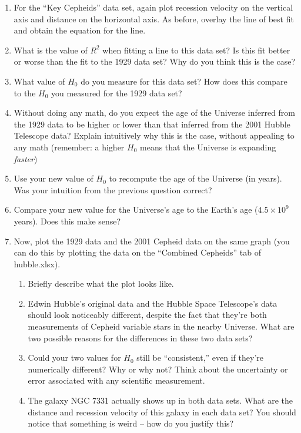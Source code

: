 \documentclass[11pt]{article}
\begin{document}
\begin{enumerate}[resume]
    \item For the ``Key Cepheids'' data set, again plot recession velocity on the vertical axis and distance on the horizontal axis. As before, overlay the line of best fit and obtain the equation for the line.
    
    \item What is the value of $R^2$ when fitting a line to this data set? Is this fit better or worse than the fit to the 1929 data set? Why do you think this is the case?
    
    \item What value of $H_0$ do you measure for this data set? How does this compare to the $H_0$ you measured for the 1929 data set? 
    
    \item Without doing any math, do you expect the age of the Universe inferred from the 1929 data to be higher or lower than that inferred from the 2001 Hubble Telescope data? Explain intuitively why this is the case, without appealing to any math (remember: a higher $H_0$ means that the Universe is expanding \emph{faster})
    
    \item Use your new value of $H_0$ to recompute the age of the Universe (in years). Was your intuition from the previous question correct?
    
    \item Compare your new value for the Universe's age to the Earth's age ($4.5 \times 10^9$ years). Does this make sense? 
    
    \item Now, plot the 1929 data and the 2001 Cepheid data on the same graph (you can do this by plotting the data on the ``Combined Cepheids'' tab of hubble.xlsx).
    \begin{enumerate}
        \item Briefly describe what the plot looks like.
        
        \item Edwin Hubble's original data and the Hubble Space Telescope's data should look noticeably different, despite the fact that they're both measurements of Cepheid variable stars in the nearby Universe. What are two possible reasons for the differences in these two data sets?
        
        \item Could your two values for $H_0$ still be ``consistent,'' even if they're numerically different? Why or why not? Think about the uncertainty or error associated with any scientific measurement. 
        
        \item The galaxy NGC 7331 actually shows up in both data sets. What are the distance and recession velocity of this galaxy in each data set? You should notice that something is weird -- how do you justify this?
    
    \end{enumerate}
\end{enumerate}
\end{document}
